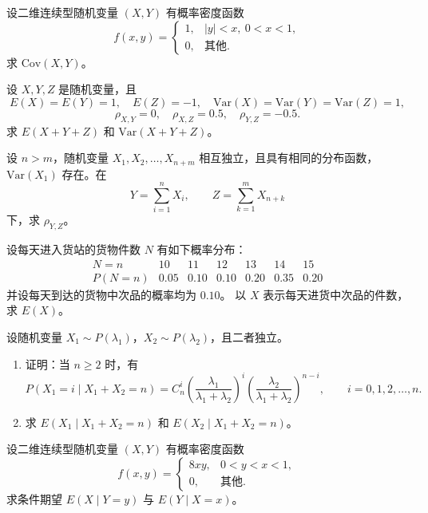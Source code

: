 \begin{homework}[3.30]
设二维连续型随机变量 $(X,Y)$ 有概率密度函数
\[
f(x,y)=
\begin{cases}
1, & |y|<x,\ 0<x<1,\\[4pt]
0, & \text{其他}.
\end{cases}
\]
求 $\mathrm{Cov}(X,Y)$。
\end{homework}

\begin{homework}[3.32]
设 $X,Y,Z$ 是随机变量，且
\[
E(X)=E(Y)=1,\quad E(Z)=-1,\quad 
\mathrm{Var}(X)=\mathrm{Var}(Y)=\mathrm{Var}(Z)=1,
\]
\[
\rho_{X,Y}=0,\quad \rho_{X,Z}=0.5,\quad \rho_{Y,Z}=-0.5.
\]
求 $E(X+Y+Z)$ 和 $\mathrm{Var}(X+Y+Z)$。
\end{homework}

\begin{homework}[3.34]
设 $n>m$，随机变量 $X_1,X_2,\ldots,X_{n+m}$ 相互独立，且具有相同的分布函数，
$\mathrm{Var}(X_1)$ 存在。在
\[
Y=\sum_{i=1}^{n} X_i,\qquad Z=\sum_{k=1}^{m} X_{n+k}
\]
下，求 $\rho_{Y,Z}$。
\end{homework}
\begin{homework}[3.37]
设每天进入货站的货物件数 $N$ 有如下概率分布：
\[
\begin{array}{c|cccccc}
N=n & 10 & 11 & 12 & 13 & 14 & 15 \\ \hline
P(N=n) & 0.05 & 0.10 & 0.10 & 0.20 & 0.35 & 0.20
\end{array}
\]
并设每天到达的货物中次品的概率均为 $0.10$。
以 $X$ 表示每天进货中次品的件数，求 $E(X)$。
\end{homework}

\begin{homework}[3.38]
设随机变量 $X_1 \sim P(\lambda_1)$，$X_2 \sim P(\lambda_2)$，且二者独立。

\begin{enumerate}[(1)]
  \item 证明：当 $n \ge 2$ 时，有
  \[
  P(X_1=i \mid X_1+X_2=n)
  = C_n^i
    \left(\frac{\lambda_1}{\lambda_1+\lambda_2}\right)^i
    \left(\frac{\lambda_2}{\lambda_1+\lambda_2}\right)^{n-i},
  \qquad i=0,1,2,\ldots,n.
  \]
  \item 求 $E(X_1\mid X_1+X_2=n)$ 和 $E(X_2\mid X_1+X_2=n)$。
\end{enumerate}
\end{homework}

\begin{homework}[3.39]
设二维连续型随机变量 $(X,Y)$ 有概率密度函数
\[
f(x,y)=
\begin{cases}
8xy, & 0<y<x<1,\\[4pt]
0, & \text{其他}.
\end{cases}
\]
求条件期望 $E(X\mid Y=y)$ 与 $E(Y\mid X=x)$。
\end{homework}
